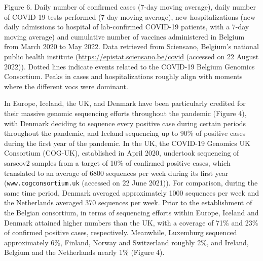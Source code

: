 Figure 6. Daily number of confirmed cases (7-day moving average), daily number of COVID-19 tests performed (7-day moving average), new hospitalizations (new daily admissions to hospital of lab-confirmed COVID-19 patients, with a 7-day moving average) and cumulative number of vaccines administered in Belgium from March 2020 to May 2022.
Data retrieved from Sciensano, Belgium's national public health institute (\url{https://epistat.sciensano.be/covid} (accessed on 22 August 2022)).
Dotted lines indicate events related to the COVID-19 Belgium Genomics Consortium.
Peaks in cases and hospitalizations roughly align with moments where the different \gls{voc}s were dominant.


In Europe, Iceland, the UK, and Denmark have been particularly credited for their massive genomic sequencing efforts throughout the pandemic (Figure 4), with Denmark deciding to sequence every positive case during certain periods throughout the pandemic, and Iceland sequencing up to 90\% of positive cases during the first year of the pandemic.
In the UK, the COVID-19 Genomics UK Consortium (COG-UK), established in April 2020, undertook sequencing of \gls{sarscov2} samples from a target of 10\% of confirmed positive cases, which translated to an average of 6800 sequences per week during its first year (\verb|www.cogconsortium.uk| (accessed on 22 June 2021)).
For comparison, during the same time period, Denmark averaged approximately 1000 sequences per week and the Netherlands averaged 370 sequences per week.
Prior to the establishment of the Belgian consortium, in terms of sequencing efforts within Europe, Iceland and Denmark attained higher numbers than the UK, with a coverage of 71\% and 23\% of confirmed positive cases, respectively.
Meanwhile, Luxemburg sequenced approximately 6\%, Finland, Norway and Switzerland roughly 2\%, and Ireland, Belgium and the Netherlands nearly 1\% (Figure 4).

